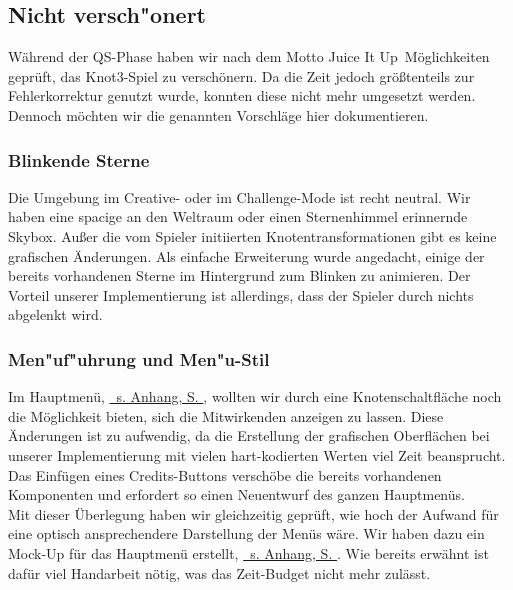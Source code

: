 %



\newpage



\subsection{Nicht versch{"o}nert} %
\label{Abschnitt:Aenderungen:Protokoll:Verschoenerungen:Nicht}

Während der QS-Phase haben wir nach dem Motto \glqq Juice It Up\grqq~Möglichkeiten geprüft, das Knot3-Spiel zu verschönern. Da die Zeit jedoch größtenteils zur Fehlerkorrektur genutzt wurde, konnten diese nicht mehr umgesetzt werden. Dennoch möchten wir die genannten Vorschläge hier dokumentieren.\\


\subsubsection*{Blinkende Sterne}
\label{Abschnitt:Aenderungen:Protokoll:Verschoenerungen:Nicht:Blinkende_Sterne}

Die Umgebung im Creative- oder im Challenge-Mode ist recht neutral. Wir haben eine spacige an den Weltraum oder einen Sternenhimmel erinnernde Skybox. Außer die vom Spieler initiierten Knotentransformationen gibt es keine grafischen Änderungen. Als einfache Erweiterung wurde angedacht, einige der bereits vorhandenen Sterne im Hintergrund zum Blinken zu animieren. Der Vorteil unserer Implementierung ist allerdings, dass der Spieler durch nichts abgelenkt wird.\\

\subsubsection*{Men{"u}f{"u}hrung und Men{"u}-Stil}
\label{Abschnitt:Aenderungen:Protokoll:Verschoenerungen:Nicht:Menues}

Im Hauptmenü, \hyperref[Abschnitt:Anhang:Aenderungen:Nicht]{ \mousecursor~s. Anhang, S. \pageref{Abschnitt:Anhang:Aenderungen:Nicht}}, wollten wir durch eine Knotenschaltfläche noch die Möglichkeit bieten, sich die Mitwirkenden anzeigen zu lassen. Diese Änderungen ist zu aufwendig, da die Erstellung der grafischen Oberflächen bei unserer Implementierung mit vielen hart-kodierten Werten viel Zeit beansprucht. Das Einfügen eines Credits-Buttons verschöbe die bereits vorhandenen Komponenten und erfordert so einen Neuentwurf des ganzen Hauptmenüs.\\

Mit dieser Überlegung haben wir gleichzeitig geprüft, wie hoch der Aufwand für eine optisch ansprechendere Darstellung der Menüs wäre. Wir haben dazu ein Mock-Up für das Hauptmenü erstellt, \hyperref[Abschnitt:Anhang:Aenderungen:Nicht]{ \mousecursor~s. Anhang, S. \pageref{Abschnitt:Anhang:Aenderungen:Nicht}}. Wie bereits erwähnt ist dafür viel Handarbeit nötig, was das Zeit-Budget nicht mehr zulässt.\\







